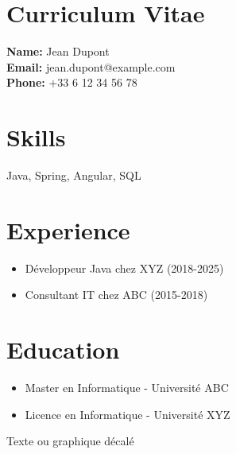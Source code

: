 \documentclass{article}
\begin{document}
\section*{Curriculum Vitae}
\textbf{Name:} Jean Dupont \\
\textbf{Email:} jean.dupont@example.com \\
\textbf{Phone:} +33 6 12 34 56 78 \\

\section*{Skills}
Java, Spring, Angular, SQL

\section*{Experience}
\begin{itemize}
  \item Développeur Java chez XYZ (2018-2025)
  \item Consultant IT chez ABC (2015-2018)
\end{itemize}

\section*{Education}
\begin{itemize}
  \item Master en Informatique - Université ABC
  \item Licence en Informatique - Université XYZ
\end{itemize}

\hspace{2cm}
\begin{minipage}{8cm}
Texte ou graphique décalé
\end{minipage}
\end{document}
